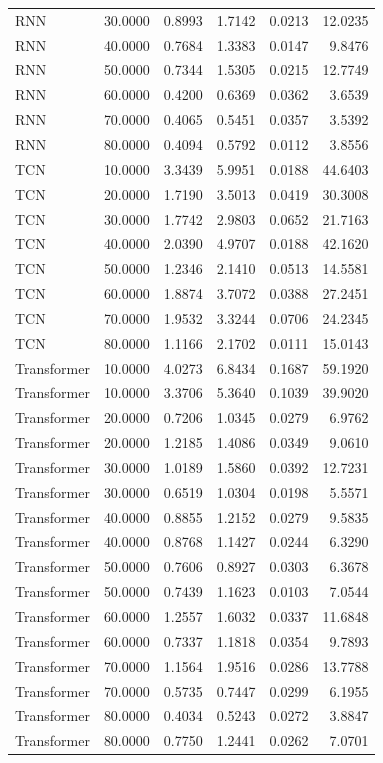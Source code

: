 \begin{tabular}{lrrrrr}
RNN & 30.0000 & 0.8993 & 1.7142 & 0.0213 & 12.0235 \\
RNN & 40.0000 & 0.7684 & 1.3383 & 0.0147 & 9.8476 \\
RNN & 50.0000 & 0.7344 & 1.5305 & 0.0215 & 12.7749 \\
RNN & 60.0000 & 0.4200 & 0.6369 & 0.0362 & 3.6539 \\
RNN & 70.0000 & 0.4065 & 0.5451 & 0.0357 & 3.5392 \\
RNN & 80.0000 & 0.4094 & 0.5792 & 0.0112 & 3.8556 \\
TCN & 10.0000 & 3.3439 & 5.9951 & 0.0188 & 44.6403 \\
TCN & 20.0000 & 1.7190 & 3.5013 & 0.0419 & 30.3008 \\
TCN & 30.0000 & 1.7742 & 2.9803 & 0.0652 & 21.7163 \\
TCN & 40.0000 & 2.0390 & 4.9707 & 0.0188 & 42.1620 \\
TCN & 50.0000 & 1.2346 & 2.1410 & 0.0513 & 14.5581 \\
TCN & 60.0000 & 1.8874 & 3.7072 & 0.0388 & 27.2451 \\
TCN & 70.0000 & 1.9532 & 3.3244 & 0.0706 & 24.2345 \\
TCN & 80.0000 & 1.1166 & 2.1702 & 0.0111 & 15.0143 \\
Transformer & 10.0000 & 4.0273 & 6.8434 & 0.1687 & 59.1920 \\
Transformer & 10.0000 & 3.3706 & 5.3640 & 0.1039 & 39.9020 \\
Transformer & 20.0000 & 0.7206 & 1.0345 & 0.0279 & 6.9762 \\
Transformer & 20.0000 & 1.2185 & 1.4086 & 0.0349 & 9.0610 \\
Transformer & 30.0000 & 1.0189 & 1.5860 & 0.0392 & 12.7231 \\
Transformer & 30.0000 & 0.6519 & 1.0304 & 0.0198 & 5.5571 \\
Transformer & 40.0000 & 0.8855 & 1.2152 & 0.0279 & 9.5835 \\
Transformer & 40.0000 & 0.8768 & 1.1427 & 0.0244 & 6.3290 \\
Transformer & 50.0000 & 0.7606 & 0.8927 & 0.0303 & 6.3678 \\
Transformer & 50.0000 & 0.7439 & 1.1623 & 0.0103 & 7.0544 \\
Transformer & 60.0000 & 1.2557 & 1.6032 & 0.0337 & 11.6848 \\
Transformer & 60.0000 & 0.7337 & 1.1818 & 0.0354 & 9.7893 \\
Transformer & 70.0000 & 1.1564 & 1.9516 & 0.0286 & 13.7788 \\
Transformer & 70.0000 & 0.5735 & 0.7447 & 0.0299 & 6.1955 \\
Transformer & 80.0000 & 0.4034 & 0.5243 & 0.0272 & 3.8847 \\
Transformer & 80.0000 & 0.7750 & 1.2441 & 0.0262 & 7.0701 \\
\bottomrule
\end{tabular}

